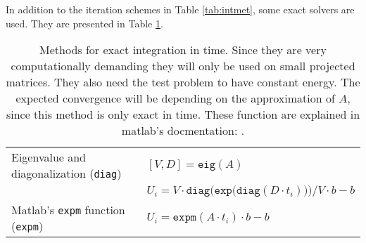 \noindent In addition to the iteration schemes in Table \ref{tab:intmet}, some exact solvers are used. They are presented in Table \ref{tab:intcorrect}.
\begin{table}

\caption{Methods for exact integration in time. Since they are very computationally demanding they will only be used on small projected matrices. They also need the test problem to have constant energy. The expected convergence will be depending on the approximation of $A$, since this method is only exact in time. These function are explained in matlab's docmentation: \cite{expm}. }

\begin{tabular}{l l}
Eigenvalue and diagonalization (\texttt{diag}) & $[V,D] = \texttt{eig}(A)$ \\
 & $U_i = V \cdot \texttt{diag} \Big( \texttt{exp} \big( \texttt{diag}(D \cdot t_i)\big)\Big)/V \cdot b - b$ \\
 \hline
Matlab's \texttt{expm} function (\texttt{expm}) & $U_i = \texttt{expm}(A \cdot t_i) \cdot b - b$ \\

\end{tabular}

\label{tab:intcorrect} 
\end{table}

